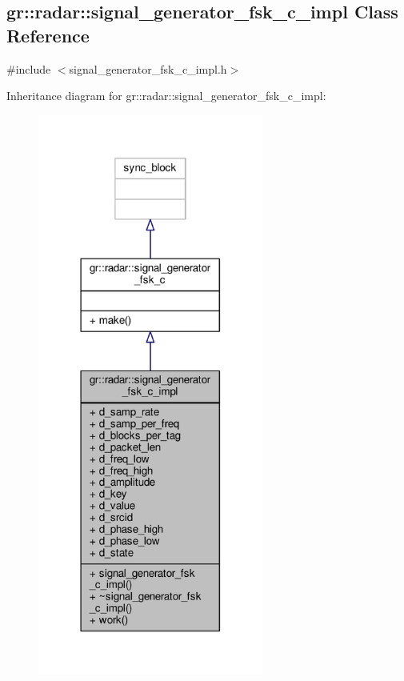 \subsection{gr\+:\+:radar\+:\+:signal\+\_\+generator\+\_\+fsk\+\_\+c\+\_\+impl Class Reference}
\label{classgr_1_1radar_1_1signal__generator__fsk__c__impl}


{\ttfamily \#include $<$signal\+\_\+generator\+\_\+fsk\+\_\+c\+\_\+impl.\+h$>$}



Inheritance diagram for gr\+:\+:radar\+:\+:signal\+\_\+generator\+\_\+fsk\+\_\+c\+\_\+impl\+:
\nopagebreak
\begin{figure}[H]
\begin{center}
\leavevmode
\includegraphics[width=210pt]{de/dc5/classgr_1_1radar_1_1signal__generator__fsk__c__impl__inherit__graph}
\end{center}
\end{figure}



